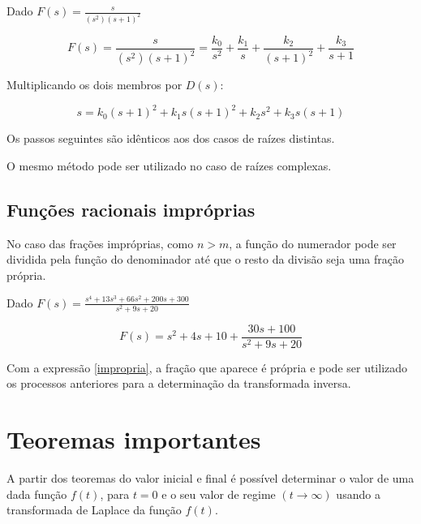 \documentclass[12pt,fleqn]{book} %
\begin{document}
\begin{example}
Dado $F(s) = \frac{s}{(s^2)(s+1)^2}$

\begin{equation}
F(s) = \frac{s}{(s^2)(s+1)^2} = \frac{k_0}{s^2} + \frac{k_1}{s} + \frac{k_2}{(s+1)^2}+\frac{k_3}{s+1}
\end{equation}

Multiplicando os dois membros por $D(s)$:

\begin{equation}
s = k_0(s+1)^2 + k_1s(s+1)^2 + k_2s^2+k_3s(s+1)
\end{equation}

Os passos seguintes são idênticos aos dos casos de raízes distintas.

\begin{remark}
O mesmo método pode ser utilizado no caso de raízes complexas. 
\end{remark}

\end{example}


\subsection{Funções racionais impróprias}

No caso das frações impróprias, como $n>m$, a função do numerador pode ser dividida pela função do denominador até que o resto da divisão seja uma fração própria.

\begin{example}

Dado $F(s) = \frac{s^4+13s^3+66s^2+200s+300}{s^2+9s+20}$

\begin{equation}\label{impropria}
F(s) = s^2+4s+10+\frac{30s+100}{s^2+9s+20}
\end{equation}

Com a expressão \ref{impropria}, a fração que aparece é própria e pode ser utilizado os processos anteriores para a determinação da transformada inversa.

\end{example}        
    
    \section{Teoremas importantes}
    
    A partir dos teoremas do valor inicial e final é possível determinar o valor de uma dada função $f(t)$, para $t=0$ e o seu valor de regime $(t\rightarrow\infty)$ usando a transformada de Laplace da função $f(t)$.
    
\end{document}
